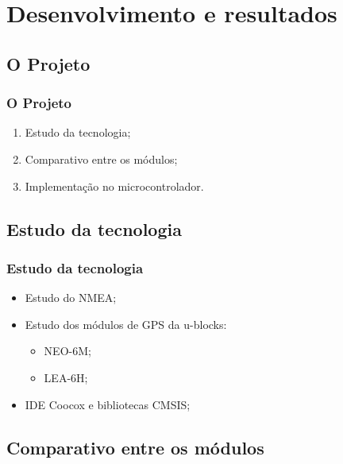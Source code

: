 \section{Desenvolvimento e resultados}


\subsection{O Projeto}

\begin{frame}
\frametitle{O Projeto}
\begin{enumerate}
\item Estudo da tecnologia;
\pause \item Comparativo entre os módulos;
\pause \item Implementação no microcontrolador.
\end{enumerate}
\end{frame}

\subsection{Estudo da tecnologia}

\begin{frame}
\frametitle{Estudo da tecnologia}
\begin{itemize}
\item Estudo do NMEA;
\pause
\item Estudo dos módulos de GPS da u-blocks:
	\begin{itemize}
	\item NEO-6M;
	\item LEA-6H;
	\end{itemize}
\pause
\item IDE Coocox e bibliotecas CMSIS;
\end{itemize}
\end{frame}

\subsection{Comparativo entre os módulos}

